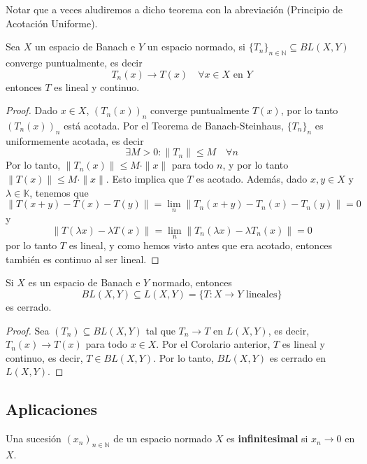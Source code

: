 \begin{notacion}
    Notar que a veces aludiremos a dicho teorema con la abreviación  (Principio de Acotación Uniforme).
\end{notacion}

\begin{coro}
    Sea $X$ un espacio de Banach e $Y$ un espacio normado, si $\{T_n\}_{n \in \mathbb{N}} \subseteq BL(X, Y)$ converge puntualmente, es decir
    \begin{equation*}
        T_n(x) \longrightarrow T(x) \quad \forall x \in X \text{ en } Y
    \end{equation*}
    entonces $T$ es lineal y continuo.
\begin{proof}
    Dado $x \in X$, $(T_n(x))_n$ converge puntualmente $T(x)$, por lo tanto $(T_n(x))_n$ está acotada. Por el Teorema de Banach-Steinhaus, $\{T_n\}_n$ es uniformemente acotada, es decir
    $$\exists M > 0 : \|T_n\| \leq M \quad \forall n$$
    Por lo tanto, $\|T_n(x)\| \leq M \cdot \|x\|$ para todo $n$, y por lo tanto $\|T(x)\| \leq M \cdot \|x\|$. Esto implica que $T$ es acotado. Además, dado $x, y \in X$ y $\lambda \in \mathbb{K}$, tenemos que
    $$\|T(x + y) - T(x) - T(y)\| = \lim_{n} \|T_n(x + y) - T_n(x) - T_n(y)\|=0$$
    y
    $$\|T(\lambda x) - \lambda T(x)\| = \lim_{n} \|T_n(\lambda x) - \lambda T_n(x)\| = 0$$
    por lo tanto $T$ es lineal, y como hemos visto antes que era acotado, entonces también es continuo al ser lineal.
\end{proof}
\end{coro}

\begin{coro}
    Si $X$ es un espacio de Banach e $Y$ normado, entonces 
    $$BL(X, Y) \subseteq L(X, Y) = \{ T: X \to Y \text{ lineales} \}$$ 
    es cerrado.
\begin{proof}
    Sea $(T_n) \subseteq BL(X, Y)$ tal que $T_n \longrightarrow T$ en $L(X, Y)$, es decir, $T_n(x) \longrightarrow T(x)$ para todo $x \in X$. Por el Corolario anterior, $T$ es lineal y continuo, es decir, $T \in BL(X, Y)$. Por lo tanto, $BL(X, Y)$ es cerrado en $L(X, Y)$.
\end{proof}
\end{coro}


\subsection{Aplicaciones}

\begin{definicion}
    Una sucesión $(x_n)_{n\in \mathbb{N}}$ de un espacio normado $X$ es \textbf{infinitesimal} si $x_n \to 0$ en $X$.
\end{definicion}

